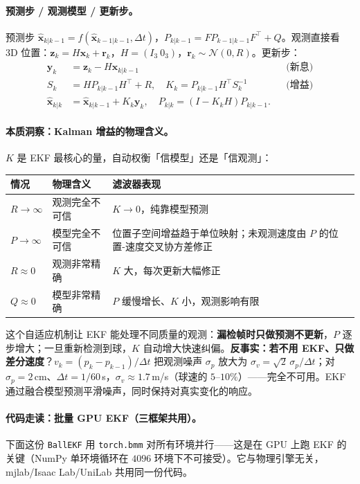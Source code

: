 \paragraph{预测步 / 观测模型 / 更新步。}预测步 $\hat{\mathbf x}_{k|k-1}=f(\hat{\mathbf x}_{k-1|k-1},\Delta t)$，$P_{k|k-1}=FP_{k-1|k-1}F^{\!\top}+Q$。观测直接看 3D 位置：$\mathbf z_k=H\mathbf x_k+\mathbf r_k$，$H=(I_3\ 0_3)$，$\mathbf r_k\sim\mathcal N(0,R)$。更新步：
\begin{align}
\mathbf y_k&=\mathbf z_k-H\hat{\mathbf x}_{k|k-1} && \text{(新息)}\label{eq:rlmc-perc-innov}\\
S_k&=HP_{k|k-1}H^{\!\top}+R, \quad K_k=P_{k|k-1}H^{\!\top}S_k^{-1} && \text{(增益)}\label{eq:rlmc-perc-gain}\\
\hat{\mathbf x}_{k|k}&=\hat{\mathbf x}_{k|k-1}+K_k\mathbf y_k,\quad P_{k|k}=(I-K_kH)P_{k|k-1}.&&\label{eq:rlmc-perc-update}
\end{align}

\paragraph{本质洞察：Kalman 增益的物理含义。}$K$ 是 EKF 最核心的量，自动权衡「信模型」还是「信观测」：

\begin{center}
\small
\begin{tabular}{@{}lll@{}}
\toprule
情况 & 物理含义 & 滤波器表现 \\
\midrule
$R\to\infty$ & 观测完全不可信 & $K\to 0$，纯靠模型预测 \\
$P\to\infty$ & 模型完全不可信 & 位置子空间增益趋于单位映射；未观测速度由 $P$ 的位置-速度交叉协方差修正 \\
$R\approx 0$ & 观测非常精确 & $K$ 大，每次更新大幅修正 \\
$Q\approx 0$ & 模型非常精确 & $P$ 缓慢增长、$K$ 小，观测影响有限 \\
\bottomrule
\end{tabular}
\end{center}

这个自适应机制让 EKF 能处理不同质量的观测：\textbf{漏检帧时只做预测不更新}，$P$ 逐步增大；一旦重新检测到球，$K$ 自动增大快速纠偏。\textbf{反事实：若不用 EKF、只做差分速度}？$v_k=(p_k-p_{k-1})/\Delta t$ 把观测噪声 $\sigma_p$ 放大为 $\sigma_v=\sqrt2\,\sigma_p/\Delta t$；对 $\sigma_p=2$\,cm、$\Delta t=1/60$\,s，$\sigma_v\approx 1.7$\,m/s（球速的 $5$--$10\%$）——完全不可用。EKF 通过融合模型预测平滑噪声，同时保持对真实变化的响应。

\paragraph{代码走读：批量 GPU EKF（三框架共用）。}下面这份 \verb|BallEKF| 用 \verb|torch.bmm| 对所有环境并行——这是在 GPU 上跑 EKF 的关键（NumPy 单环境循环在 $4096$ 环境下不可接受）。它与物理引擎无关，mjlab/Isaac Lab/UniLab 共用同一份代码。

